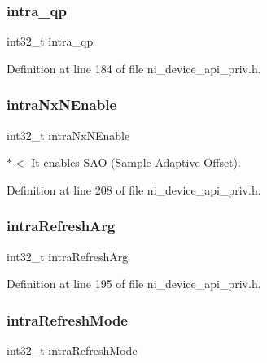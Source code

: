 \subsubsection{\texorpdfstring{intra\_qp}{intra\_qp}}
{\footnotesize\ttfamily int32\+\_\+t intra\+\_\+qp}



Definition at line 184 of file ni\+\_\+device\+\_\+api\+\_\+priv.\+h.

\mbox{\label{struct__ni__t408__config__t_a22a0ae7af1f32d0bbbc6ecd0bcee4b2d}} 
\subsubsection{\texorpdfstring{intraNxNEnable}{intraNxNEnable}}
{\footnotesize\ttfamily int32\+\_\+t intra\+Nx\+N\+Enable}

$\ast$$<$ It enables S\+AO (Sample Adaptive Offset). 

Definition at line 208 of file ni\+\_\+device\+\_\+api\+\_\+priv.\+h.

\mbox{\label{struct__ni__t408__config__t_aac7eb3b757e665e9be99a2886571a556}} 
\subsubsection{\texorpdfstring{intraRefreshArg}{intraRefreshArg}}
{\footnotesize\ttfamily int32\+\_\+t intra\+Refresh\+Arg}



Definition at line 195 of file ni\+\_\+device\+\_\+api\+\_\+priv.\+h.

\mbox{\label{struct__ni__t408__config__t_a653491351aa4ed441635561e032455b8}} 
\subsubsection{\texorpdfstring{intraRefreshMode}{intraRefreshMode}}
{\footnotesize\ttfamily int32\+\_\+t intra\+Refresh\+Mode}

